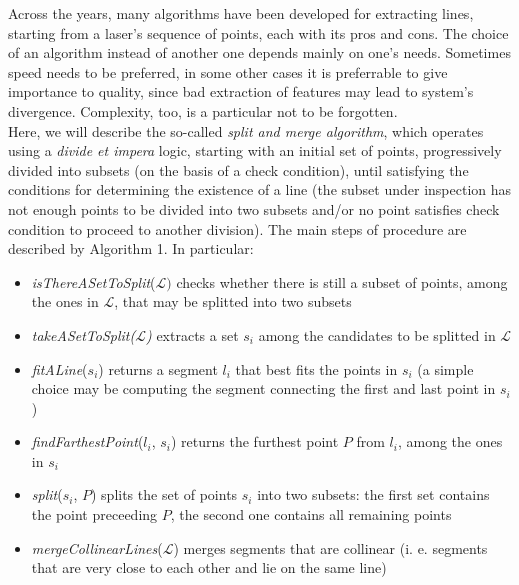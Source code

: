 \documentclass[a4paper, onecolumn]{report}
\begin{document}
Across the years, many algorithms have been developed for extracting lines, starting from a laser's sequence of points, each with its pros and cons. The choice of an algorithm instead of another one depends mainly on one's needs. Sometimes speed needs to be preferred, in some other cases it is preferrable to give importance to quality, since bad extraction of features may lead to system's divergence. Complexity, too, is a particular not to be forgotten. \\ 
Here, we will describe the so-called \emph{split and merge algorithm}, which operates using a \emph{divide et impera} logic, starting with an initial set of points, progressively divided into subsets (on the basis of a check condition), until satisfying the conditions for determining the existence of a line (the subset under inspection has not enough points to be divided into two subsets and/or no point satisfies check condition to proceed to another division).
The main steps of procedure are described by Algorithm 1. In particular:
\begin{itemize}
\item{\emph{isThereASetToSplit}($\mathcal{L})$ checks whether there is still a subset of points, among the ones in $\mathcal{L}$, that may be splitted into two subsets}
\item{\emph{takeASetToSplit($\mathcal{L}$)} extracts a set $s_i$ among the candidates to be splitted in $\mathcal{L}$}
\item{\emph{fitALine}($s_i$) returns a segment $l_i$ that best fits the points in $s_i$ (a simple choice may be computing the segment connecting the first and last point in $s_i$)}
\item{\emph{findFarthestPoint}($l_i$, $s_i$) returns the furthest point $P$ from $l_i$, among the ones in $s_i$}
\item{\emph{split}($s_i$, $P$) splits the set of points $s_i$ into two subsets: the first set contains the point preceeding $P$, the second one contains all remaining points}
\item{\emph{mergeCollinearLines}($\mathcal{L}$) merges segments that are collinear (i. e. segments that are very close to each other and lie on the same line)}
\end{itemize}
\end{document}
